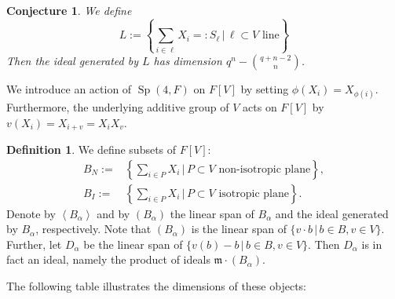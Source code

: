 \documentclass{amsart}
\DeclareMathOperator{\Sp}{Sp}
\theoremstyle{plain}
\newtheorem{conjecture}[theorem]{Conjecture}
\theoremstyle{definition}
\newtheorem{definition}[theorem]{Definition}
\theoremstyle{remark}
\begin{document}
\begin{conjecture} We define
$$
L := \left\{\sum_{i\in \ell}X_i=:S_\ell \,|\, \ell\subset V \text{ line}\right\}
$$
Then the ideal generated by $L$ has dimension $q^n - \binom{q+n-2}{n}$.
\end{conjecture}


We introduce an action of $\Sp (4,F)$ on $F[V]$ by setting $\phi(X_i) = X_{\phi(i)}$. Furthermore, the underlying additive group of $V$ acts on $F[V]$ by $v( X_i) = X_{i+v} =X_iX_v$. 

\begin{definition} We define subsets of $F[V]$:
\begin{align*}
B_N :=  & \left\{\sum_{i\in P}X_i \,|\, P\subset V \text{ non-isotropic plane}\right\}, \\
B_I := &  \left\{\sum_{i\in P}X_i \,|\, P\subset V \text{ isotropic plane}\right\}.
\end{align*}
Denote by $\left< B_\alpha \right>$ and by $(B_\alpha)$ the linear span of $B_\alpha$ and the ideal generated by $B_\alpha$, respectively. Note that $(B_\alpha) $ is the linear span of $ \{ v\cdot b \,|\, b\in B, v\in V \}$.
Further, let $D_\alpha$ be the linear span of $\{v(b) - b \,|\, b\in B, v\in V \}$. Then $D_\alpha$ is in fact an ideal, namely the product of ideals $\mathfrak m\cdot (B_\alpha)$.
\end{definition}
The following table illustrates the dimensions of these objects:
\vspace{2mm}
\end{document}
